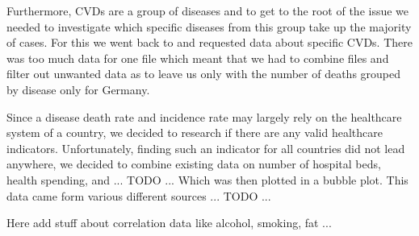 Furthermore, CVDs are a group of diseases and to get to the root of the issue we needed to investigate which specific diseases from this group take up the majority of cases. For this we went back to \citep{GBD2019} and requested data about specific CVDs. There was too much data for one file which meant that we had to combine files and filter out unwanted data as to leave us only with the number of deaths grouped by disease only for Germany. 

Since a disease death rate and incidence rate may largely rely on the healthcare system of a country, we decided to research if there are any valid healthcare indicators. Unfortunately, finding such an indicator for all countries did not lead anywhere, we decided to combine existing data on number of hospital beds, health spending, and ... TODO ...
Which was then plotted in a bubble plot. This data came form various different sources ... TODO ...

Here add stuff about correlation data like alcohol, smoking, fat ...